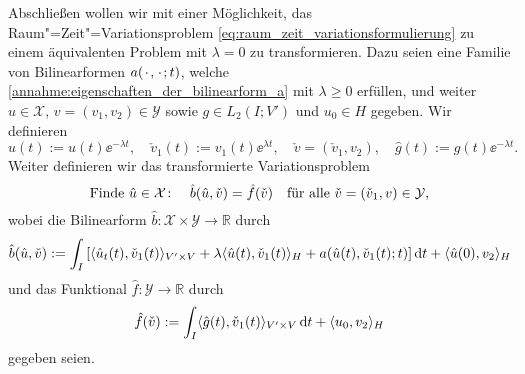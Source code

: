 Abschließen wollen wir mit einer Möglichkeit, das Raum"=Zeit"=Variationsproblem \cref{eq:raum_zeit_variationsformulierung} zu einem äquivalenten Problem mit $\lambda = 0$ zu transformieren.
Dazu seien eine Familie von Bilinearformen $a({\mkern2mu\cdot\mkern2mu}, {\mkern2mu\cdot\mkern2mu}; t)$, welche \cref{annahme:eigenschaften_der_bilinearform_a} mit $\lambda \geq 0$ erfüllen, und weiter $u \in \mathcal X$, $v = (v_{1}, v_{2}) \in \mathcal Y$ sowie $g \in L_{2}(I; V')$ und $u_{0} \in H$ gegeben.
Wir definieren
\begin{equation}
    \hat{u}(t) := u(t)\ee^{- \lambda t}, \quad \check{v}_{1}(t) := v_{1}(t)\ee^{\lambda t}, \quad \check{v} = (\check{v}_{1}, v_{2}), \quad \hat{g}(t) := g(t)\ee^{-\lambda t}.
\end{equation}
Weiter definieren wir das transformierte Variationsproblem
\begin{equation}
\label{eq:transformiertes_raum_zeit_variationsproblem}
    \text{Finde } \hat{u} \in \mathcal X \colon \quad \hat{b}(\hat{u}, \check{v}) = \hat{f}(\check{v}) \quad \fa \check{v} = (\check{v}_{1}, v) \in \mathcal Y,
\end{equation}
wobei die Bilinearform $\hat{b} \colon \mathcal X \times \mathcal Y \to \mathbb{R}$ durch
\begin{equation}
    \hat{b}(\hat{u}, \check{v}) := \int_{I} \left[ \langle\hat{u}_{t}(t),\check{v}_{1}(t)\rangle_{V' \times V} + \lambda \langle\hat{u}(t),\check{v}_{1}(t)\rangle_{H} + a(\hat{u}(t), \check{v}_{1}(t); t) \right] \mathop{}\!\mathrm{d} t + \langle\hat{u}(0),v_{2}\rangle_{H}
\end{equation}
und das Funktional $\hat{f} \colon \mathcal Y \to \mathbb{R}$ durch
\begin{equation}
    \hat{f}(\check{v}) := \int_{I} \langle\hat{g}(t),\check{v}_{1}(t)\rangle_{V' \times V} \mathop{}\!\mathrm{d} t + \langle u_{0},v_{2}\rangle_{H}
\end{equation}
gegeben seien.

